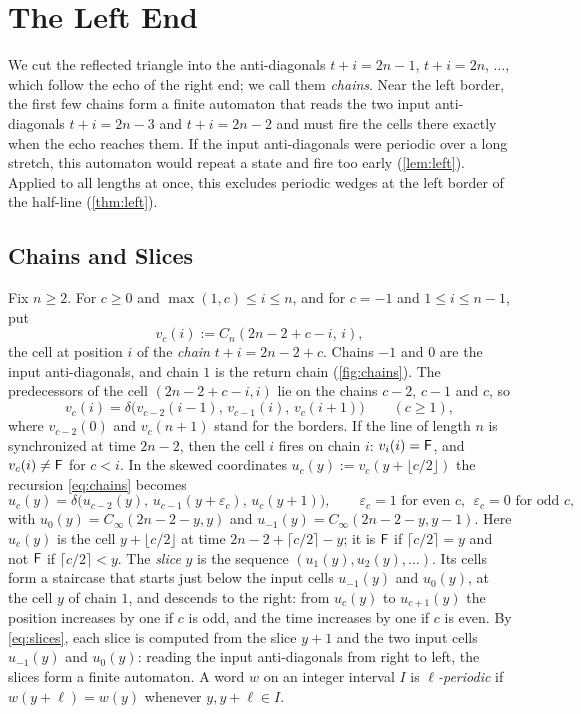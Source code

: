 \section{The Left End}\label{sec:left}

We cut the reflected triangle into the anti-diagonals $t+i=2n-1$, $t+i=2n$,
$\dots$, which follow the echo of the right end; we call them \emph{chains}.
Near the left border, the first few chains form a finite automaton that reads
the two input anti-diagonals $t+i=2n-3$ and $t+i=2n-2$ and must fire the cells
there exactly when the echo reaches them. If the input anti-diagonals were
periodic over a long stretch, this automaton would repeat a state and fire too
early (\cref{lem:left}). Applied to all lengths at once, this excludes periodic
wedges at the left border of the half-line (\cref{thm:left}).

\subsection{Chains and Slices}

Fix $n\ge2$. For $c\ge0$ and $\max(1,c)\le i\le n$, and for $c=-1$ and $1\le
i\le n-1$, put
\[
v_c(i):=C_n(2n-2+c-i,\,i),
\]
the cell at position $i$ of the \emph{chain} $t+i=2n-2+c$. Chains $-1$ and $0$
are the input anti-diagonals, and chain $1$ is the return chain
(\cref{fig:chains}). The predecessors of the cell $(2n-2+c-i,i)$ lie on the
chains $c-2$, $c-1$ and $c$, so
\begin{equation}\label{eq:chains}
v_c(i)=\delta\bigl(v_{c-2}(i-1),\,v_{c-1}(i),\,v_c(i+1)\bigr)\qquad(c\ge1),
\end{equation}
where $v_{c-2}(0)$ and $v_c(n+1)$ stand for the borders. If the line of length
$n$ is synchronized at time $2n-2$, then the cell $i$ fires on chain $i$:
$v_i(i)=\mathsf F$, and $v_c(i)\ne\mathsf F$ for $c<i$. In the skewed coordinates
$u_c(y):=v_c(y+\lfloor c/2\rfloor)$ the recursion \eqref{eq:chains} becomes
\begin{equation}\label{eq:slices}
u_c(y)=\delta\bigl(u_{c-2}(y),\,u_{c-1}(y+\varepsilon_c),\,u_c(y+1)\bigr),
\qquad \varepsilon_c=1\text{ for even }c,\ \ \varepsilon_c=0\text{ for odd }c,
\end{equation}
with $u_0(y)=C_\infty(2n-2-y,y)$ and $u_{-1}(y)=C_\infty(2n-2-y,y-1)$. Here
$u_c(y)$ is the cell $y+\lfloor c/2\rfloor$ at time $2n-2+\lceil c/2\rceil-y$;
it is $\mathsf F$ if $\lceil c/2\rceil=y$ and not $\mathsf F$ if $\lceil c/2\rceil<y$. The
\emph{slice} $y$ is the sequence $(u_1(y),u_2(y),\dots)$. Its cells form a
staircase that starts just below the input cells $u_{-1}(y)$ and $u_0(y)$, at
the cell $y$ of chain $1$, and descends to the right: from $u_c(y)$ to
$u_{c+1}(y)$ the position increases by one if $c$ is odd, and the time
increases by one if $c$ is even. By \eqref{eq:slices}, each slice is computed
from the slice $y+1$ and the two input cells $u_{-1}(y)$ and $u_0(y)$: reading
the input anti-diagonals from right to left, the slices form a finite
automaton. A word $w$ on an
integer interval $I$ is \emph{$\ell$-periodic} if $w(y+\ell)=w(y)$ whenever
$y,y+\ell\in I$.

